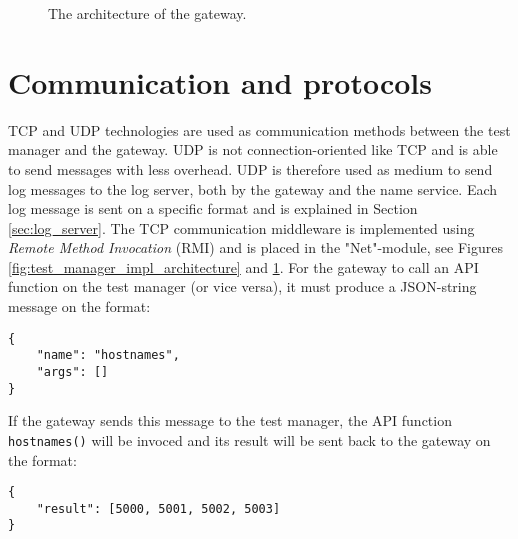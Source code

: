 \begin{figure}[h!]
    \centering
    \caption{The architecture of the gateway.}
    \label{fig:gateway_impl_architecture}
\end{figure}

\section{Communication and protocols}

TCP and UDP technologies are used as communication methods between the test
manager and the gateway. UDP is not connection-oriented like TCP and is able to
send messages with less overhead. UDP is therefore used as medium to send log
messages to the log server, both by the gateway and the name service. Each log
message is sent on a specific format and is explained in Section
\ref{sec:log_server}. The TCP communication middleware is implemented using
\textit{Remote Method Invocation} (RMI) \cite{coulouris2005distributed} and is
placed in the "Net"-module, see Figures
\ref{fig:test_manager_impl_architecture} and
\ref{fig:gateway_impl_architecture}. For the gateway to call an API function on
the test manager (or vice versa), it must produce a JSON-string message on the
format:

\begin{lstlisting}
{
    "name": "hostnames",
    "args": []
}
\end{lstlisting}

If the gateway sends this message to the test manager, the API function
\texttt{hostnames()} will be invoced and its result will be sent back to the
gateway on the format:

\begin{lstlisting}
{
    "result": [5000, 5001, 5002, 5003]
}
\end{lstlisting}

